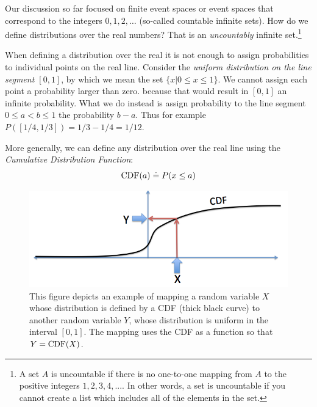 Our discussion so far focused on finite event spaces or event spaces
that correspond to the integers $0,1,2,\ldots$ (so-called countable
infinite sets). How do we define distributions over the real numbers?
That is an {\em uncountably} infinite set.\footnote{A set $A$ is
  uncountable if there is no one-to-one mapping from $A$ to the
  positive integers $1,2,3,4,...$. In other words, a set is
  uncountable if you cannot create a list which includes all of the
  elements in the set.}

When defining a distribution over the real it is not enough to assign
probabilities to individual points on the real line. Consider the {\em
  uniform distribution on the line segment $[0,1]$}, by which
we mean the set $\{x | 0 \leq x \leq 1\}$. We cannot assign each
point a probability larger than zero. because that would result in
$[0,1]$ an infinite probability. What we do instead is assign
probability to the line segment $0 \leq a < b \leq 1$ the probability
$b-a$. Thus for example $P([1/4,1/3])=1/3-1/4 = 1/12$.

More generally, we can define any distribution over the real line
using the {\em Cumulative Distribution Function}:
\[
\mbox{CDF}(a) \doteq P(x \leq a)
\]

\begin{figure}[th]
\begin{center}
\includegraphics[width=5in]{figs/CDFmapping.png}
\end{center}
\caption{This figure depicts an example of mapping a random variable
  $X$ whose distribution is defined by a CDF (thick black curve) to
  another random variable $Y$, whose distribution is uniform in the
  interval $[0,1]$. The mapping uses the CDF as a function so that
  $Y=\mbox{CDF}(X)$. \label{fig:CDFmap}}
\end{figure}

